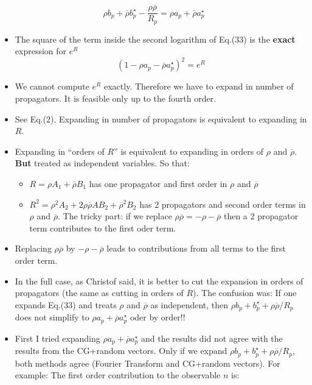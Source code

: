 \documentclass[a4paper,10pt]{report}
\newcommand{\rrb}{\overline{\rho}}
\newcommand{\rr}{\rho}
\begin{document}
$$
\rr b_p + \rrb b_p^\star - \frac{\rr\rrb}{R_p} = \rr a_p + \rrb a_p^\star
$$

\begin{itemize}
\item The square of the term inside the second logarithm of Eq.(33) is the {\bf exact} expression
for $e^R$
$$(1-\rr a_p - \rrb a_p^\star)^2 = e^{R}$$

\item We cannot compute $e^{R}$ exactly.  Therefore we have to expand in number of propagators. 
It is feasible only up to the fourth order.

\item See Eq.(2).  Expanding in number of propagators is equivalent to expanding in $R$. 

\item Expanding in ``orders of $R$'' is equivalent to expanding in orders of $\rr$ and $\rrb$.
{\bf But} treated as independent variables. So that:   
  \begin{itemize}
  \item $R = \rr A_{1} + \rrb B_{1}$ has one propagator and first order in $\rr$ and $\rrb$
  \item $R^{2} = \rr^{2} A_{2} + 2 \rr \rrb AB_{2} + \rrb^{2} B_{2}$ has 2 propagators and second order terms in $\rr$ and $\rrb$.
  The tricky part:  if we replace $\rr \rrb = -\rr - \rrb$ then a 2 propagator term contributes to the first oder term.
    \end{itemize}
  \item Replacing $\rr\rrb$ by $-\rr -\rrb$ leads to contributions from all terms to the first order term.
  
  \item In the full case, as Christof said, it is better to cut the expansion in orders of propagators
  (the same as cutting in orders of $R$).  The confusion was:  
  If one expands Eq.(33) and treats $\rr$ and $\rrb$ as independent, 
  then  $\rr b_{p} +  b_{p}^{\star} + \rr\rrb/R_{p} $ does not simplify to $\rr a_{p} + \rrb a_{p}^\star$ oder by order!!  
  
  \item First I tried expanding  $\rr a_{p} + \rrb a_{p}^\star$ and the results did not agree with the results from the CG+random vectors. 
 Only if we expand $\rr b_{p} +  b_{p}^{\star} + \rr\rrb/R_{p}$, both methods agree (Fourier Transform and CG+random vectors).
For example:  The first order contribution to the observable $n$ is:


\end{itemize}
\end{document}
